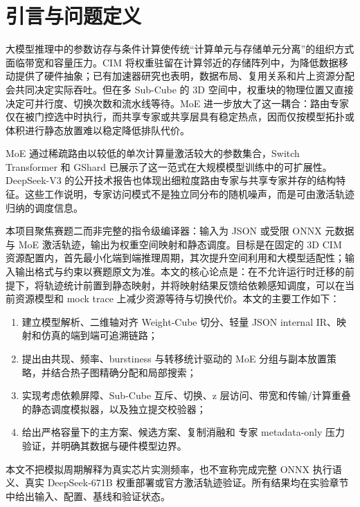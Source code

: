 \section{引言与问题定义}
大模型推理中的参数访存与条件计算使传统“计算单元与存储单元分离”的组织方式面临带宽和容量压力。CIM 将权重驻留在计算邻近的存储阵列中，为降低数据移动提供了硬件抽象；已有加速器研究也表明，数据布局、复用关系和片上资源分配会共同决定实际吞吐\cite{sze2017efficient}。但在多 Sub-Cube 的 3D 空间中，权重块的物理位置又直接决定可并行度、切换次数和流水线等待。MoE 进一步放大了这一耦合：路由专家仅在被门控选中时执行，而共享专家或共享层具有稳定热点，因而仅按模型拓扑或体积进行静态放置难以稳定降低排队代价。

MoE 通过稀疏路由以较低的单次计算量激活较大的参数集合，Switch Transformer 和 GShard 已展示了这一范式在大规模模型训练中的可扩展性\cite{fedus2022switch,lepikhin2021gshard}。DeepSeek-V3 的公开技术报告也体现出细粒度路由专家与共享专家并存的结构特征\cite{deepseek2024v3}。这些工作说明，专家访问模式不是独立同分布的随机噪声，而是可由激活轨迹归纳的调度信息。

本项目聚焦赛题二而非完整的指令级编译器：输入为 JSON 或受限 ONNX 元数据与 MoE 激活轨迹，输出为权重空间映射和静态调度。目标是在固定的 3D CIM 资源配置内，首先最小化端到端推理周期，其次提升空间利用和大模型适配性；输入输出格式与约束以赛题原文为准\cite{contest2026}。本文的核心论点是：在不允许运行时迁移的前提下，将轨迹统计前置到静态映射，并将映射结果反馈给依赖感知调度，可以在当前资源模型和 mock trace 上减少资源等待与切换代价。本文的主要工作如下：
\begin{enumerate}
\item 建立模型解析、二维轴对齐 Weight-Cube 切分、轻量 JSON internal IR、映射和仿真的端到端可追溯链路；
\item 提出由共现、频率、burstiness 与转移统计驱动的 MoE 分组与副本放置策略，并结合热子图精确分配和局部搜索；
\item 实现考虑依赖屏障、Sub-Cube 互斥、切换、z 层访问、带宽和传输/计算重叠的静态调度模拟器，以及独立提交校验器；
\item 给出严格容量下的主方案、候选方案、复制消融和 \LargeExperts{} 专家 metadata-only 压力验证，并明确其数据与硬件模型边界。
\end{enumerate}

本文不把模拟周期解释为真实芯片实测频率，也不宣称完成完整 ONNX 执行语义、真实 DeepSeek-671B 权重部署或官方激活轨迹验证。所有结果均在实验章节中给出输入、配置、基线和验证状态。
